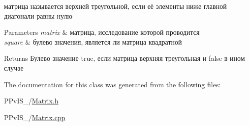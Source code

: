 матрица называется верхней треугольной, если её элементы ниже главной диагонали равны нулю 
\begin{DoxyParams}{Parameters}
{\em matrix} & матрица, исследование которой проводится \\
\hline
{\em square} & булево значения, является ли матрица квадратной \\
\hline
\end{DoxyParams}
\begin{DoxyReturn}{Returns}
Булево значение true, если матрица верхняя треугольная и false в ином случае
\end{DoxyReturn}


The documentation for this class was generated from the following files\-:\begin{DoxyCompactItemize}
\item 
P\-Pv\-I\-S\-\_/\hyperlink{_matrix_8h}{Matrix.\-h}\item 
P\-Pv\-I\-S\-\_/\hyperlink{_matrix_8cpp}{Matrix.\-cpp}\end{DoxyCompactItemize}
